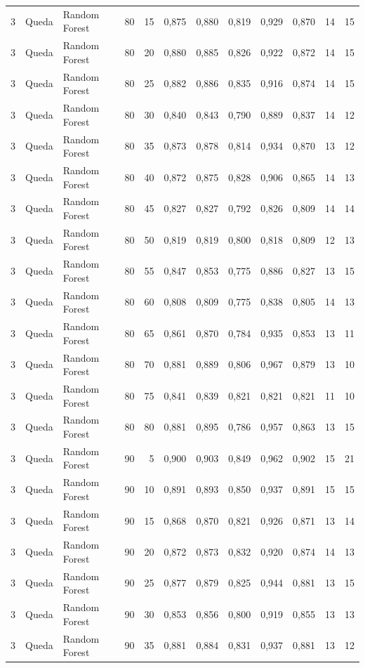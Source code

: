 \begin{longtable}{@{}rllrrrrrrrrr@{}}
3 & Queda & Random Forest & 80 & 15 & 0,875 & 0,880 & 0,819 & 0,929 & 0,870 & 14 & 15 \\
3 & Queda & Random Forest & 80 & 20 & 0,880 & 0,885 & 0,826 & 0,922 & 0,872 & 14 & 15 \\
3 & Queda & Random Forest & 80 & 25 & 0,882 & 0,886 & 0,835 & 0,916 & 0,874 & 14 & 15 \\
3 & Queda & Random Forest & 80 & 30 & 0,840 & 0,843 & 0,790 & 0,889 & 0,837 & 14 & 12 \\
3 & Queda & Random Forest & 80 & 35 & 0,873 & 0,878 & 0,814 & 0,934 & 0,870 & 13 & 12 \\
3 & Queda & Random Forest & 80 & 40 & 0,872 & 0,875 & 0,828 & 0,906 & 0,865 & 14 & 13 \\
3 & Queda & Random Forest & 80 & 45 & 0,827 & 0,827 & 0,792 & 0,826 & 0,809 & 14 & 14 \\
3 & Queda & Random Forest & 80 & 50 & 0,819 & 0,819 & 0,800 & 0,818 & 0,809 & 12 & 13 \\
3 & Queda & Random Forest & 80 & 55 & 0,847 & 0,853 & 0,775 & 0,886 & 0,827 & 13 & 15 \\
3 & Queda & Random Forest & 80 & 60 & 0,808 & 0,809 & 0,775 & 0,838 & 0,805 & 14 & 13 \\
3 & Queda & Random Forest & 80 & 65 & 0,861 & 0,870 & 0,784 & 0,935 & 0,853 & 13 & 11 \\
3 & Queda & Random Forest & 80 & 70 & 0,881 & 0,889 & 0,806 & 0,967 & 0,879 & 13 & 10 \\
3 & Queda & Random Forest & 80 & 75 & 0,841 & 0,839 & 0,821 & 0,821 & 0,821 & 11 & 10 \\
3 & Queda & Random Forest & 80 & 80 & 0,881 & 0,895 & 0,786 & 0,957 & 0,863 & 13 & 15 \\
3 & Queda & Random Forest & 90 & 5 & 0,900 & 0,903 & 0,849 & 0,962 & 0,902 & 15 & 21 \\
3 & Queda & Random Forest & 90 & 10 & 0,891 & 0,893 & 0,850 & 0,937 & 0,891 & 15 & 15 \\
3 & Queda & Random Forest & 90 & 15 & 0,868 & 0,870 & 0,821 & 0,926 & 0,871 & 13 & 14 \\
3 & Queda & Random Forest & 90 & 20 & 0,872 & 0,873 & 0,832 & 0,920 & 0,874 & 14 & 13 \\
3 & Queda & Random Forest & 90 & 25 & 0,877 & 0,879 & 0,825 & 0,944 & 0,881 & 13 & 15 \\
3 & Queda & Random Forest & 90 & 30 & 0,853 & 0,856 & 0,800 & 0,919 & 0,855 & 13 & 13 \\
3 & Queda & Random Forest & 90 & 35 & 0,881 & 0,884 & 0,831 & 0,937 & 0,881 & 13 & 12 \\

\end{longtable}
